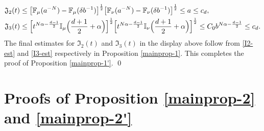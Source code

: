 \documentclass[a4paper,11pt]{amsart}
\numberwithin{equation}{section}
\begin{document}
\begin{align*} 
\mathfrak J_2(t) &\leq  \bigl[\mathbb F_{\mu}(a^{-N}) - \mathbb F_{\mu}(\delta b^{-1}) \bigr]^{\frac{1}{2}}  \bigl[\mathbb F_{\nu}(a^{-N}) - \mathbb F_{\nu}(\delta b^{-1}) \bigr]^{\frac{1}{2}} \leq a \leq c_d, \\
\mathfrak J_3(t) &\leq \Bigl[ t^{N \alpha - \frac{d-1}{2}} \mathbb I_{\mu} \Bigl(\frac{d+1}{2} + \alpha \Bigr) \Bigr]^{\frac{1}{2}} \Bigl[ t^{N \alpha - \frac{d-1}{2}} \mathbb I_{\nu} \Bigl(\frac{d+1}{2} + \alpha \Bigr) \Bigr]^{\frac{1}{2}} \leq C_0 b^{N \alpha - \frac{d-1}{2}} \leq c_d. 
\end{align*} 
The final estimates for $\mathfrak I_2(t)$ and $\mathfrak I_3(t)$ in the display above follow from \eqref{I2-est} and \eqref{I3-est} respectively in Proposition \ref{mainprop-1}. This completes the proof of Proposition \ref{mainprop-1'}.  
\qed



\section{Proofs of Proposition \ref{mainprop-2} and \ref{mainprop-2'}} \label{mainprop-2-section}
\end{document}
